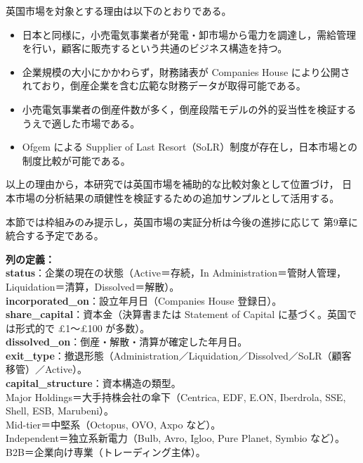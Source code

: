 英国市場を対象とする理由は以下のとおりである。

\begin{itemize}
    \item 日本と同様に，小売電気事業者が発電・卸市場から電力を調達し，需給管理を行い，顧客に販売するという共通のビジネス構造を持つ。
    \item 企業規模の大小にかかわらず，財務諸表が Companies House により公開されており，倒産企業を含む広範な財務データが取得可能である。
    \item 小売電気事業者の倒産件数が多く，倒産段階モデルの外的妥当性を検証するうえで適した市場である。
    \item Ofgem による Supplier of Last Resort（SoLR）制度が存在し，日本市場との制度比較が可能である。
\end{itemize}

以上の理由から，本研究では英国市場を補助的な比較対象として位置づけ，
日本市場の分析結果の頑健性を検証するための追加サンプルとして活用する。

本節では枠組みのみ提示し，英国市場の実証分析は今後の進捗に応じて
第9章に統合する予定である。

\vspace{1em}

\begin{flushleft}
\textbf{列の定義：}\\
\textbf{status}：企業の現在の状態（Active＝存続，In Administration＝管財人管理，Liquidation＝清算，Dissolved＝解散）。\\
\textbf{incorporated\_on}：設立年月日（Companies House 登録日）。\\
\textbf{share\_capital}：資本金（決算書または Statement of Capital に基づく。英国では形式的で £1〜£100 が多数）。\\
\textbf{dissolved\_on}：倒産・解散・清算が確定した年月日。\\
\textbf{exit\_type}：撤退形態（Administration／Liquidation／Dissolved／SoLR（顧客移管）／Active）。\\
\textbf{capital\_structure}：資本構造の類型。\\
\quad Major Holdings＝大手持株会社の傘下（Centrica, EDF, E.ON, Iberdrola, SSE, Shell, ESB, Marubeni）。\\
\quad Mid-tier＝中堅系（Octopus, OVO, Axpo など）。\\
\quad Independent＝独立系新電力（Bulb, Avro, Igloo, Pure Planet, Symbio など）。\\
\quad B2B＝企業向け専業（トレーディング主体）。\\
\end{flushleft}

